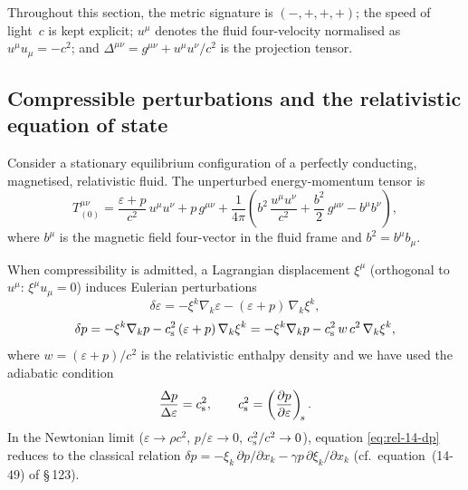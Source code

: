 Throughout this section, the metric signature is $(-,+,+,+)$; the
speed of light~$c$ is kept explicit; $u^{\mu}$ denotes the fluid
four-velocity normalised as $u^{\mu}u_{\mu} = -c^{2}$; and
$\Delta^{\mu\nu} = g^{\mu\nu} + u^{\mu}u^{\nu}/c^{2}$ is the
projection tensor.

\subsection{Compressible perturbations and the relativistic
  equation of state}\label{sec:rel-123a}

Consider a stationary equilibrium configuration of a perfectly
conducting, magnetised, relativistic fluid.  The unperturbed
energy-momentum tensor is
\begin{equation}\label{eq:rel-14-T0}
  T^{\mu\nu}_{(0)}
  = \frac{\varepsilon + p}{c^{2}}\,u^{\mu}u^{\nu}
    + p\,g^{\mu\nu}
    + \frac{1}{4\pi}\!\left(
      b^{2}\,\frac{u^{\mu}u^{\nu}}{c^{2}}
      + \frac{b^{2}}{2}\,g^{\mu\nu}
      - b^{\mu}b^{\nu}\right),
\end{equation}
where $b^{\mu}$ is the magnetic field four-vector in the fluid frame
and $b^{2} = b^{\mu}b_{\mu}$.

When compressibility is admitted, a Lagrangian displacement
$\xi^{\mu}$ (orthogonal to $u^{\mu}$:
$\xi^{\mu}u_{\mu}=0$) induces Eulerian perturbations
\begin{equation}\label{eq:rel-14-dE}
  \delta\varepsilon
  = -\xi^{k}\nabla_{k}\varepsilon
    - (\varepsilon + p)\,\nabla_{k}\xi^{k},
\end{equation}
\begin{equation}\label{eq:rel-14-dp}
  \delta p
  = -\xi^{k}\nabla_{k}p
    - c_{\mathrm{s}}^{2}\,(\varepsilon + p)\,\nabla_{k}\xi^{k}
  = -\xi^{k}\nabla_{k}p
    - c_{\mathrm{s}}^{2}\,w\,c^{2}\,\nabla_{k}\xi^{k},
\end{equation}
where $w = (\varepsilon + p)/c^{2}$ is the relativistic enthalpy
density and we have used the adiabatic condition
\begin{equation}\label{eq:rel-14-adiabat}
  \frac{\Delta p}{\Delta\varepsilon}
  = c_{\mathrm{s}}^{2},
  \qquad
  c_{\mathrm{s}}^{2}
  = \left(\frac{\partial p}{\partial\varepsilon}\right)_{\!s}.
\end{equation}
In the Newtonian limit ($\varepsilon \to \rho c^{2}$,
$p/\varepsilon \to 0$, $c_{\mathrm{s}}^{2}/c^{2}\to 0$), equation
\eqref{eq:rel-14-dp} reduces to the classical relation
$\delta p = -\xi_{k}\,\partial p/\partial x_{k}
  - \gamma p\,\partial\xi_{k}/\partial x_{k}$
(cf.\ equation~(14-49) of \S\,123).


